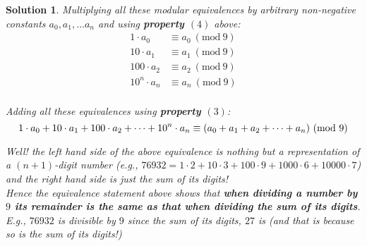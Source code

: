 \documentclass{article}
\newtheorem*{solution*}{Solution}
\newcommand{\Mod}[1]{\ (\mathrm{mod}\ #1)}
\begin{document}
\begin{solution*}
    Multiplying all these modular equivalences by arbitrary
    non-negative constants $a_0, a_1, \dots a_n$ and using
    \textbf{property $(4)$} above:
    \begin{align*}
        1\cdot{a_0} &\equiv a_0 \Mod 9\\
        10\cdot{a_1} &\equiv a_1 \Mod 9\\
        100\cdot{a_2} &\equiv a_2 \Mod 9\\
        10^n\cdot{a_n} &\equiv a_n \Mod 9\\
    \end{align*}

    Adding all these equivalences using \textbf{property $(3)$}:
    \begin{equation*}
        1\cdot{a_0} + 10\cdot{a_1} + 100\cdot{a_2} + \dots + 10^n\cdot{a_n} 
        \equiv
        (a_0 + a_1 + a_2 + \dots + a_n) \Mod 9\\
    \end{equation*}

    Well! the left hand side of the above equivalence is nothing
    but a representation of a $(n+1)$-digit number 
    (e.g., $76932 = 
    1\cdot{2} + 10\cdot{3} + 100\cdot{9} + 1000\cdot{6} + 10000\cdot{7}$)
    and the right hand side is just the sum of its digits!\\

    Hence the equivalence statement above shows that 
    \textbf{when dividing a number by $9$ its remainder 
    is the same as that when dividing the sum of its digits}.\\
    
    E.g., $76932$ is divisible by $9$
    since the sum of its digits, $27$ is (and that is because 
    so is the sum of its digits!)
\end{solution*}
\end{document}
